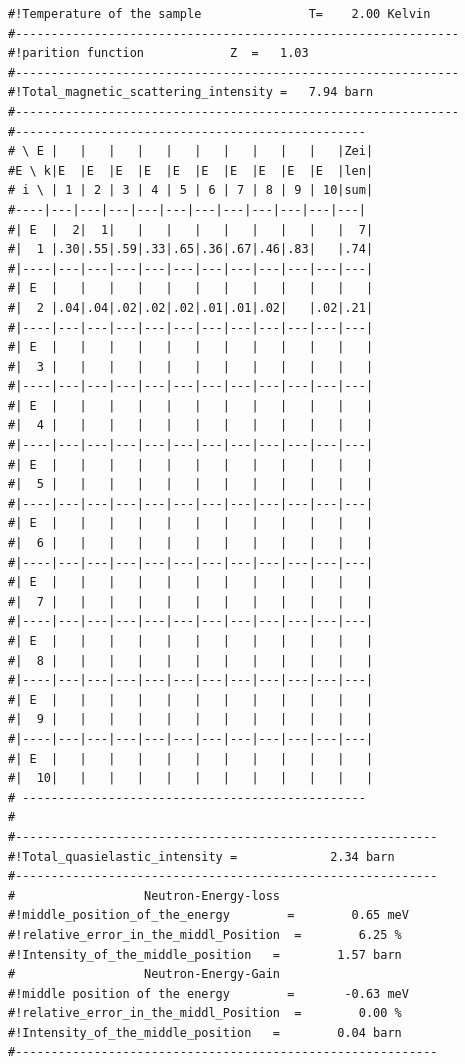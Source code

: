 \begin{enumerate}
{\begin{verbatim}
#!Temperature of the sample               T=    2.00 Kelvin         
#-------------------------------------------------------------- 
#!parition function            Z  =   1.03                 
#-------------------------------------------------------------- 
#!Total_magnetic_scattering_intensity =   7.94 barn            
#-------------------------------------------------------------- 
#------------------------------------------------- 
# \ E |   |   |   |   |   |   |   |   |   |   |Zei|
#E \ k|E  |E  |E  |E  |E  |E  |E  |E  |E  |E  |len|
# i \ | 1 | 2 | 3 | 4 | 5 | 6 | 7 | 8 | 9 | 10|sum|
#----|---|---|---|---|---|---|---|---|---|---|---|
#| E  |  2|  1|   |   |   |   |   |   |   |   |  7|
#|  1 |.30|.55|.59|.33|.65|.36|.67|.46|.83|   |.74|
#|----|---|---|---|---|---|---|---|---|---|---|---|
#| E  |   |   |   |   |   |   |   |   |   |   |   |
#|  2 |.04|.04|.02|.02|.02|.01|.01|.02|   |.02|.21|
#|----|---|---|---|---|---|---|---|---|---|---|---|
#| E  |   |   |   |   |   |   |   |   |   |   |   |
#|  3 |   |   |   |   |   |   |   |   |   |   |   |
#|----|---|---|---|---|---|---|---|---|---|---|---|
#| E  |   |   |   |   |   |   |   |   |   |   |   |
#|  4 |   |   |   |   |   |   |   |   |   |   |   |
#|----|---|---|---|---|---|---|---|---|---|---|---|
#| E  |   |   |   |   |   |   |   |   |   |   |   |
#|  5 |   |   |   |   |   |   |   |   |   |   |   |
#|----|---|---|---|---|---|---|---|---|---|---|---|
#| E  |   |   |   |   |   |   |   |   |   |   |   |
#|  6 |   |   |   |   |   |   |   |   |   |   |   |
#|----|---|---|---|---|---|---|---|---|---|---|---|
#| E  |   |   |   |   |   |   |   |   |   |   |   |
#|  7 |   |   |   |   |   |   |   |   |   |   |   |
#|----|---|---|---|---|---|---|---|---|---|---|---|
#| E  |   |   |   |   |   |   |   |   |   |   |   |
#|  8 |   |   |   |   |   |   |   |   |   |   |   |
#|----|---|---|---|---|---|---|---|---|---|---|---|
#| E  |   |   |   |   |   |   |   |   |   |   |   |
#|  9 |   |   |   |   |   |   |   |   |   |   |   |
#|----|---|---|---|---|---|---|---|---|---|---|---|
#| E  |   |   |   |   |   |   |   |   |   |   |   |
#|  10|   |   |   |   |   |   |   |   |   |   |   |
# ------------------------------------------------ 
#
#-----------------------------------------------------------
#!Total_quasielastic_intensity =             2.34 barn           
#-----------------------------------------------------------
#                  Neutron-Energy-loss                      
#!middle_position_of_the_energy        =        0.65 meV    
#!relative_error_in_the_middl_Position  =        6.25 %      
#!Intensity_of_the_middle_position   =        1.57 barn   
#                  Neutron-Energy-Gain                 
#!middle position of the energy        =       -0.63 meV    
#!relative_error_in_the_middl_Position  =        0.00 %      
#!Intensity_of_the_middle_position   =        0.04 barn   
#-----------------------------------------------------------


\end{verbatim}}
\end{enumerate}
